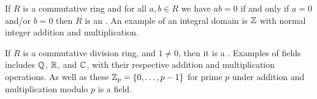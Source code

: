     
    If \(R\) is a commutative ring and for all \(a, b\in R\) we have \(ab = 0\) if and only if \(a = 0\) and/or \(b = 0\) then \(R\) is an .
    An example of an integral domain is \(\mathbb{Z}\) with normal integer addition and multiplication.
    
    If \(R\) is a commutative division ring, and \(1\ne 0\), then it is a .
    Examples of fields includes \(\mathbb{Q}\), \(\mathbb{R}\), and \(\mathbb{C}\), with their respective addition and multiplication operations.
    As well as these \(\mathbb{Z}_p = \{0, \dotsc, p-1\}\) for prime \(p\) under addition and multiplication modulo \(p\) is a field.